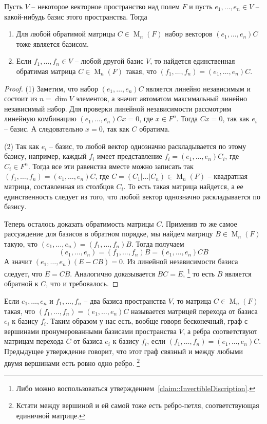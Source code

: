 \begin{claim}
\label{claim::BasisClassification}
Пусть $V$ -- некоторое векторное пространство над полем $F$ и пусть $e_1,\ldots, e_n\in V$ -- какой-нибудь базис этого пространства.
Тогда
\begin{enumerate}
\item Для любой обратимой матрицы $C\in \operatorname{M}_{n}(F)$ набор векторов $(e_1,\ldots,e_n)C$ тоже является базисом.

\item Если $f_1,\ldots,f_n\in V$ -- любой другой базис $V$, то найдется единственная обратимая матрица $C\in\operatorname{M}_n(F)$ такая, что $(f_1,\ldots,f_n) = (e_1,\ldots,e_n)C$.
\end{enumerate}
\end{claim}
\begin{proof}
(1) Заметим, что набор $(e_1,\ldots,e_n)C$ является линейно независимым и состоит из $n = \dim V$ элементов, а значит автоматом максимальный линейно независимый набор.
Для проверки линейной независимости рассмотрим линейную комбинацию $(e_1,\ldots,e_n)Cx = 0$, где $x\in F^n$.
Тогда $Cx = 0$, так как $e_i$ -- базис.
А следовательно $x = 0$, так как $C$ обратима.

(2) Так как $e_i$ -- базис, то любой вектор однозначно раскладывается по этому базису, например, каждый $f_i$ имеет представление $f_i = (e_1,\ldots, e_n) C_i$, где $C_i\in F^n$.
Тогда все эти равенства вместе можно записать так $(f_1,\ldots,f_n) = (e_1,\ldots,e_n) C$, где $C = (C_1|\ldots|C_n)\in \operatorname{M}_n (F)$ -- квадратная матрица, составленная из столбцов $C_i$.
То есть такая матрица найдется, а ее единственность следует из того, что любой вектор однозначно раскладывается по базису.

Теперь осталось доказать обратимость матрицы $C$.
Применив то же самое рассуждение для базисов в обратном порядке, мы найдем матрицу $B\in \operatorname{M}_n(F)$ такую, что $(e_1,\ldots,e_n) = (f_1,\ldots,f_n) B$.
Тогда получаем 
\[
(e_1,\ldots,e_n) = (f_1,\ldots,f_n)B = (e_1,\ldots,e_n)CB
\]
А значит $(e_1,\ldots, e_n)(E - CB) = 0$.
Из линейной независимости базиса следует, что $E = CB$.
Аналогично доказывается $BC = E$,%
\footnote{Либо можно воспользоваться утверждением~\ref{claim::InvertibleDiscription}.} то есть $B$ является обратной к $C$, что и требовалось.
\end{proof}


Если $e_1,\ldots,e_n$ и $f_1,\ldots,f_n$ -- два базиса пространства $V$, то матрица $C\in \operatorname{M}_n(F)$ такая, что $(f_1,\ldots, f_n) = (e_1,\ldots,e_n)C$ называется матрицей перехода от базиса $e_i$ к базису $f_i$.
Таким образом у нас есть, вообще говоря бесконечный, граф с вершинами пронумерованными базисами пространства $V$, а ребра соответствуют матрицам перехода $C$ от базиса $e_i$ к базису $f_i$, если $(f_1,\ldots,f_n) = (e_1,\ldots,e_n)C$.
Предыдущее утверждение говорит, что этот граф связный и между любыми двумя вершинами есть ровно одно ребро.%
\footnote{Кстати между вершиной и ей самой тоже есть ребро-петля, соответствующая единичной матрице.}

